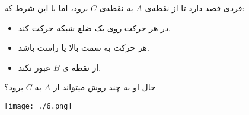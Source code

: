 \EXERCISE
فردی قصد دارد تا از نقطه‌ی $A$ به نقطه‌ی $C$ برود، اما با این شرط که:
\begin{itemize}
    \item 
   در هر حرکت روی یک ضلع شبکه حرکت کند.

    \item 
 هر حرکت به سمت بالا یا راست باشد.
 
	\item 
از نقطه ی $B$ عبور نکند.
\end{itemize}

حال او به چند روش میتواند از $A$ به $C$ برود؟

    \begin{center}
     	\texttt{[image: ./6.png]}
    \end{center}